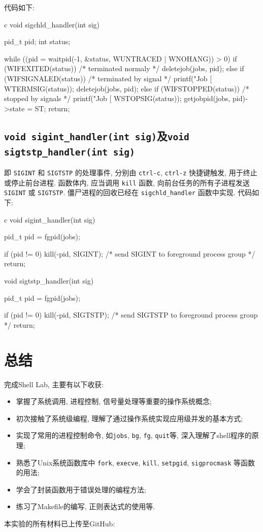 代码如下:

\begin{code}{c}
void sigchld_handler(int sig) {
  pid_t pid;
  int status;

  while ((pid = waitpid(-1, &status, WUNTRACED | WNOHANG)) > 0) {
    if (WIFEXITED(status)) /* terminated normaly */
      deletejob(jobs, pid);
    else if (WIFSIGNALED(status)) { /* terminated by signal */
      printf("Job [%
             WTERMSIG(status));
      deletejob(jobs, pid);
    } else if (WIFSTOPPED(status)) { /* stopped by signals */
      printf("Job [%
             WSTOPSIG(status));
      getjobpid(jobs, pid)->state = ST;
    }
  }
  return;
}
\end{code}

\subsection{\texttt{void sigint_handler(int sig)}及\texttt{void sigtstp_handler(int sig)}}

即 \verb|SIGINT| 和 \verb|SIGTSTP| 的处理事件, 分别由 \verb|ctrl-c|, \verb|ctrl-z| 快捷键触发, 用于终止或停止前台进程. 函数体内, 应当调用 \verb|kill| 函数, 向前台任务的所有子进程发送 \verb|SIGINT| 或 \verb|SIGTSTP|. 僵尸进程的回收已经在 \verb|sigchld_handler| 函数中实现. 代码如下:

\begin{code}{c}
void sigint_handler(int sig) {
  pid_t pid = fgpid(jobs);

  if (pid != 0)
    kill(-pid, SIGINT); /* send SIGINT to foreground process group */
  return;
}
void sigtstp_handler(int sig) {
  pid_t pid = fgpid(jobs);

  if (pid != 0)
    kill(-pid, SIGTSTP); /* send SIGTSTP to foreground process group */
  return;
}
\end{code}

\clearpage
\section{总结}

完成Shell Lab, 主要有以下收获:
\begin{itemize}
    \item  掌握了系统调用, 进程控制, 信号量处理等重要的操作系统概念;
    \item  初次接触了系统级编程, 理解了通过操作系统实现应用级并发的基本方式;
    \item  实现了常用的进程控制命令, 如\verb|jobs|, \verb|bg|, \verb|fg|, \verb|quit|等, 深入理解了shell程序的原理;
    \item  熟悉了Unix系统函数库中 \verb|fork|, \verb|execve|, \verb|kill|, \verb|setpgid|, \verb|sigprocmask| 等函数的用法;
    \item  学会了封装函数用于错误处理的编程方法;
    \item  练习了Makefile的编写, 正则表达式的使用等.
\end{itemize}
本实验的所有材料已上传至GitHub:


